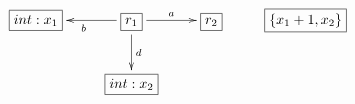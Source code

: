 $\xymatrix{
   \fbox{$int:x_1$} & \fbox{$r_1$} \ar[l]^{b} \ar[d]^{d} \ar[r]^{a} & \fbox{$r_2$} & \fbox{$\{x_1+1, x_2\}$} \\
   & \fbox{$int:x_2$}
}$
